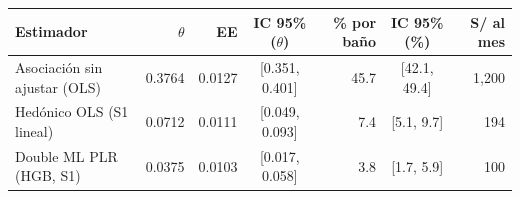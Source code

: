 \begin{tabular}{lrrcrcr}
\toprule
Estimador & $\theta$ & EE & IC 95\% ($\theta$) & \% por baño & IC 95\% (\%) & S/ al mes \\
\midrule
Asociación sin ajustar (OLS) & 0.3764 & 0.0127 & [0.351, 0.401] & 45.7 & [42.1, 49.4] & 1,200 \\
Hedónico OLS (S1 lineal) & 0.0712 & 0.0111 & [0.049, 0.093] & 7.4 & [5.1, 9.7] & 194 \\
Double ML PLR (HGB, S1) & 0.0375 & 0.0103 & [0.017, 0.058] & 3.8 & [1.7, 5.9] & 100 \\
\bottomrule
\end{tabular}